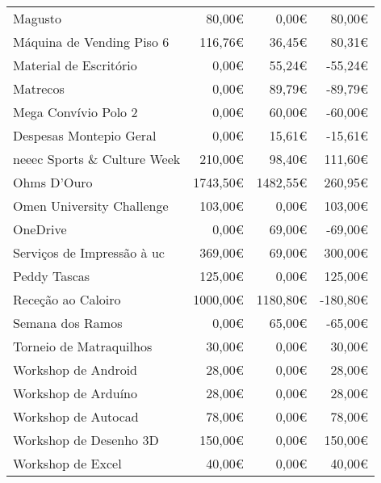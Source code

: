 \begin{longtable}{Xrrr}
Magusto & 80,00€ & 0,00€ & 80,00€ \\

Máquina de Vending Piso 6 & 116,76€ & 36,45€ & 80,31€ \\

Material de Escritório & 0,00€ & 55,24€ & -55,24€ \\

Matrecos & 0,00€ & 89,79€ & -89,79€ \\

Mega Convívio Polo 2 & 0,00€ & 60,00€ & -60,00€ \\

Despesas Montepio Geral & 0,00€ & 15,61€ & -15,61€ \\

\acrshort{neeec} Sports \& Culture Week & 210,00€ & 98,40€ & 111,60€ \\

Ohms D'Ouro & 1743,50€ & 1482,55€ & 260,95€ \\

Omen University Challenge & 103,00€ & 0,00€ & 103,00€ \\

OneDrive & 0,00€ & 69,00€ & -69,00€ \\

Serviços de Impressão à \acrshort{uc} & 369,00€ & 69,00€ & 300,00€ \\

Peddy Tascas & 125,00€ & 0,00€ & 125,00€ \\

Receção ao Caloiro & 1000,00€ & 1180,80€ & -180,80€ \\

Semana dos Ramos & 0,00€ & 65,00€ & -65,00€ \\

Torneio de Matraquilhos & 30,00€ & 0,00€ & 30,00€ \\

Workshop de Android & 28,00€ & 0,00€ & 28,00€ \\

Workshop de Arduíno & 28,00€ & 0,00€ & 28,00€ \\

Workshop de Autocad & 78,00€ & 0,00€ & 78,00€ \\

Workshop de Desenho 3D & 150,00€ & 0,00€ & 150,00€ \\

Workshop de Excel & 40,00€ & 0,00€ & 40,00€ \\


\end{longtable}
